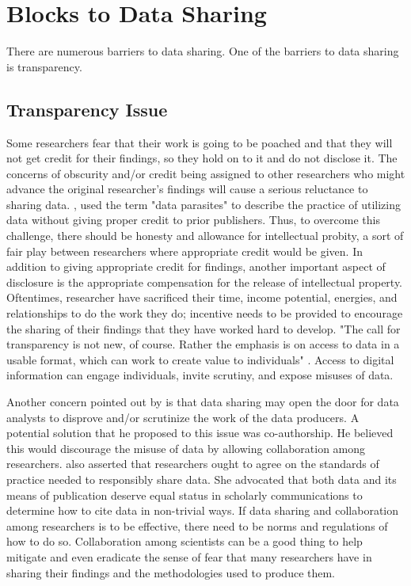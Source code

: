 \documentclass[sigconf]{acmart}
\begin{document}
\section{Blocks to Data Sharing}

There are numerous barriers to data sharing. One of the barriers to data sharing is transparency. 

\subsection{Transparency Issue}

Some researchers fear that their work is going to be poached and that they will not get credit for their findings, so they hold on to it and do not disclose it. The concerns of obscurity and/or credit being assigned to other researchers who might advance the original researcher's findings will cause a serious reluctance to sharing data. \cite{leetaru2016}, used the term "data parasites" to describe the practice of utilizing data without giving proper credit to prior publishers. Thus, to overcome this challenge, there should be honesty and allowance for intellectual probity, a sort of fair play between researchers where appropriate credit would be given. In addition to giving appropriate credit for findings, another important aspect of disclosure is the appropriate compensation for the release of intellectual property. Oftentimes, researcher have sacrificed their time, income potential, energies, and relationships to do the work they do; incentive needs to be provided to encourage the sharing of their findings that they have worked hard to develop. "The call for transparency is not new, of course. Rather the emphasis is on access to data in a usable format, which can work to create value to individuals" \cite{tene2012big}. Access to digital information can engage individuals, invite scrutiny, and expose misuses of data. 

Another concern pointed out by \cite{leetaru2016} is that data sharing may open the door for data analysts to disprove and/or scrutinize the work of the data producers. A potential solution that he proposed to this issue was co-authorship. He believed this would discourage the misuse of data by allowing collaboration among researchers. \cite{borgman2015if} also asserted that researchers ought to agree on the standards of practice needed to responsibly share data. She advocated that both data and its means of publication deserve equal status in scholarly communications to determine how to cite data in non-trivial ways. If data sharing and collaboration among researchers is to be effective, there need to be norms and regulations of how to do so. Collaboration among scientists can be a good thing to help mitigate and even eradicate the sense of fear that many researchers have in sharing their findings and the methodologies used to produce them. 
\end{document}
